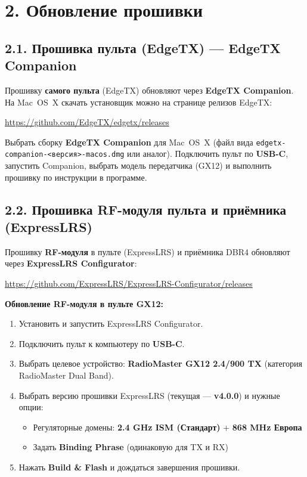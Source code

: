 \documentclass[a4paper,11pt]{article}
\begin{document}
\section{2. Обновление прошивки}

\subsection{2.1. Прошивка пульта (EdgeTX) --- EdgeTX Companion}

Прошивку \textbf{самого пульта} (EdgeTX) обновляют через \textbf{EdgeTX Companion}. На Mac~OS~X скачать установщик можно на странице релизов EdgeTX:

\url{https://github.com/EdgeTX/edgetx/releases}

Выбрать сборку \textbf{EdgeTX Companion} для Mac~OS~X (файл вида \texttt{edgetx-companion-<версия>-macos.dmg} или аналог). Подключить пульт по \textbf{USB-C}, запустить Companion, выбрать модель передатчика (GX12) и выполнить прошивку по инструкции в программе.

\subsection{2.2. Прошивка RF-модуля пульта и приёмника (ExpressLRS)}

Прошивку \textbf{RF-модуля} в пульте (ExpressLRS) и приёмника DBR4 обновляют через \textbf{ExpressLRS Configurator}:

\url{https://github.com/ExpressLRS/ExpressLRS-Configurator/releases}

\textbf{Обновление RF-модуля в пульте GX12:}
\begin{enumerate}[nosep]
  \item Установить и запустить ExpressLRS Configurator.
  \item Подключить пульт к компьютеру по \textbf{USB-C}.
  \item Выбрать целевое устройство: \textbf{RadioMaster GX12 2.4/900 TX} (категория RadioMaster Dual Band).
  \item Выбрать версию прошивки ExpressLRS (текущая --- \textbf{v4.0.0}) и нужные опции:
  \begin{itemize}[nosep]
    \item Регуляторные домены: \textbf{2.4 GHz ISM (Стандарт)} + \textbf{868 MHz Европа}
    \item Задать \textbf{Binding Phrase} (одинаковую для TX и RX)
  \end{itemize}
  \item Нажать \textbf{Build \& Flash} и дождаться завершения прошивки.
\end{enumerate}
\end{document}
